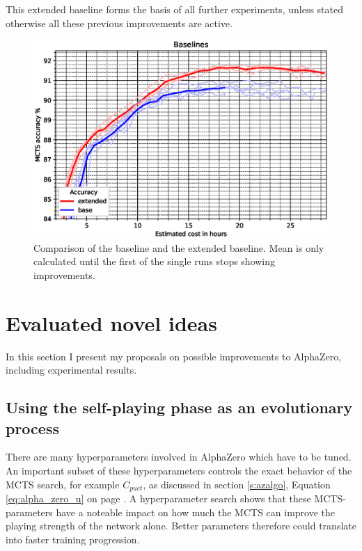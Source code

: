 \documentclass[12pt,onecolumn,oneside,titlepage]{article}
\begin{document}
This extended baseline forms the basis of all further experiments, unless stated otherwise all these previous improvements are active.

\begin{figure}[H]
\centering
\includegraphics[clip,width=\columnwidth]{baselines}
\caption{Comparison of the baseline and the extended baseline. Mean is only calculated until the first of the single runs stops showing improvements.}
\label{fig:baseline_compare}
\end{figure}


\section{Evaluated novel ideas}

In this section I present my proposals on possible improvements to AlphaZero, including experimental results.


\subsection{Using the self-playing phase as an evolutionary process} \label{s:novel_evolution}

There are many hyperparameters involved in AlphaZero which have to be tuned. An important subset of these hyperparameters controls the exact behavior of the MCTS search, for example $C_{puct}$, as discussed in section \ref{s:azalgo}, Equation \ref{eq:alpha_zero_u} on page \pageref{eq:alpha_zero_u}.
A hyperparameter search shows that these MCTS-parameters have a noteable impact on how much the MCTS can improve the playing strength of the network alone. Better parameters therefore could translate into faster training progression.
\end{document}
